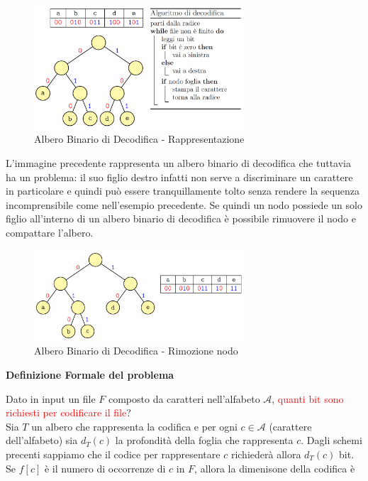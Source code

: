 \documentclass[../cheatSheetAlgoritmi.tex]{subfiles}
\begin{document}
\begin{figure}[h]
	\centering
	\includegraphics[width=0.7\textwidth]{../img/Greedy_2.png}
	\caption{Albero Binario di Decodifica - Rappresentazione}
\end{figure}
L'immagine precedente rappresenta un albero binario di decodifica che tuttavia ha un problema: il suo figlio destro infatti non serve a discriminare un carattere in particolare e quindi può essere tranquillamente tolto senza rendere la sequenza incomprensibile come nell'esempio precedente. Se quindi un nodo possiede un solo figlio all'interno di un albero binario di decodifica è possibile rimuovere il nodo e compattare l'albero.\\
\begin{figure}[h]
\centering
\includegraphics[width=0.7\textwidth]{../img/Greedy_3.png}
\caption{Albero Binario di Decodifica - Rimozione nodo}
\end{figure}
\newpage
\begin{flushleft}
\textbf{Definizione Formale del problema}
\end{flushleft}
Dato in input un file $F$ composto da caratteri nell'alfabeto $\mathcal{A}$, \textcolor{red}{quanti bit sono richiesti per codificare il file}?\\
Sia $T$ un albero che rappresenta la codifica e per ogni $c \in \mathcal{A}$ (carattere dell'alfabeto) sia $d_{T}(c)$ la profondità della foglia che rappresenta $c$. Dagli schemi precenti sappiamo che il codice per rappresentare $c$ richiederà allora $d_{T}(c)$ bit. Se $f[c]$ è il numero di occorrenze di $c$ in $F$, allora la dimenisone della codifica è
\end{document}

